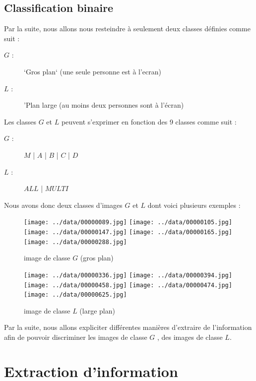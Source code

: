 \documentclass{book}
\begin{document}
\section{Classification binaire}

Par la suite, nous allons nous resteindre à seulement deux classes définies comme suit :
\begin{description} %
\item[$G$ :] `Gros plan` (une seule personne est à l'ecran)
\item[$L$ :] 'Plan large (au moins deux personnes sont à l'écran)
\end{description}


Les classes $G$ et $L$ peuvent s'exprimer en fonction des 9 classes comme suit :

\begin{description} %
\item[$G$ :] $M$ | $A$ | $B$ | $C$ | $D$
\item[$L$ :] $ALL$ | $MULTI$
\end{description}


Nous avons donc deux classes d'images $G$ et $L$ dont voici plusieurs exemples :

\begin{figure}[H]
\begin{center}
\texttt{[image: ../data/00000089.jpg]}
\texttt{[image: ../data/00000105.jpg]}
\texttt{[image: ../data/00000147.jpg]}
\texttt{[image: ../data/00000165.jpg]}
\texttt{[image: ../data/00000288.jpg]}
\end{center}
\caption{image de classe $G$ (gros plan)}
\label{classeG}
\end{figure}

\begin{figure}[H]
\begin{center}
\texttt{[image: ../data/00000336.jpg]}
\texttt{[image: ../data/00000394.jpg]}
\texttt{[image: ../data/00000458.jpg]}
\texttt{[image: ../data/00000474.jpg]}
\texttt{[image: ../data/00000625.jpg]}
\end{center}
\caption{image de classe $L$ (large plan)}
\label{classeL}
\end{figure}

Par la suite, nous allons expliciter différentes manières d'extraire de l'information afin de pouvoir discriminer les images de classe $G$
, des images de classe $L$.

\chapter{Extraction d'information}
\end{document}
